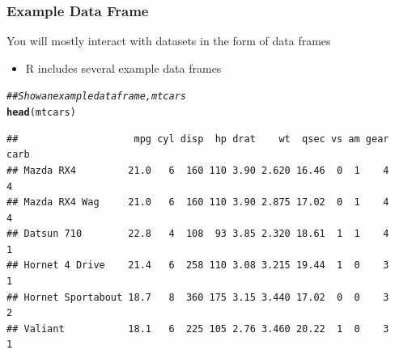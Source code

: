 \documentclass{beamer}\usepackage[]{graphicx}\usepackage[]{xcolor}
\makeatletter
\newcommand{\hlcom}[1]{\textcolor[rgb]{0.678,0.584,0.686}{\textit{#1}}}%
\newcommand{\hlstd}[1]{\textcolor[rgb]{0.345,0.345,0.345}{#1}}%
\newcommand{\hlkwd}[1]{\textcolor[rgb]{0.737,0.353,0.396}{\textbf{#1}}}%
\newenvironment{kframe}{%
 \def\at@end@of@kframe{}%
 \ifinner\ifhmode%
  \def\at@end@of@kframe{\end{minipage}}%
  \begin{minipage}{\columnwidth}%
 \fi\fi%
 \def\FrameCommand##1{\hskip\@totalleftmargin \hskip-\fboxsep
 \colorbox{shadecolor}{##1}\hskip-\fboxsep
     \hskip-\linewidth \hskip-\@totalleftmargin \hskip\columnwidth}%
 \MakeFramed {\advance\hsize-\width
   \@totalleftmargin\z@ \linewidth\hsize
   \@setminipage}}%
 {\par\unskip\endMakeFramed%
 \at@end@of@kframe}
\newenvironment{knitrout}{}{} %
\makeatother
\begin{document}
\begin{frame}[fragile]\frametitle{Example Data Frame}
    You will mostly interact with datasets in the form of data frames
    \begin{itemize}
        \item R includes several example data frames
    \end{itemize}
\begin{knitrout}\footnotesize
{}\color{fgcolor}\begin{kframe}
\begin{alltt}
\hlcom{## Show an example data frame, mtcars}
\hlkwd{head}\hlstd{(mtcars)}
\end{alltt}
\begin{verbatim}
##                    mpg cyl disp  hp drat    wt  qsec vs am gear carb
## Mazda RX4         21.0   6  160 110 3.90 2.620 16.46  0  1    4    4
## Mazda RX4 Wag     21.0   6  160 110 3.90 2.875 17.02  0  1    4    4
## Datsun 710        22.8   4  108  93 3.85 2.320 18.61  1  1    4    1
## Hornet 4 Drive    21.4   6  258 110 3.08 3.215 19.44  1  0    3    1
## Hornet Sportabout 18.7   8  360 175 3.15 3.440 17.02  0  0    3    2
## Valiant           18.1   6  225 105 2.76 3.460 20.22  1  0    3    1
\end{verbatim}
\end{kframe}
\end{knitrout}
\end{frame}
\end{document}
